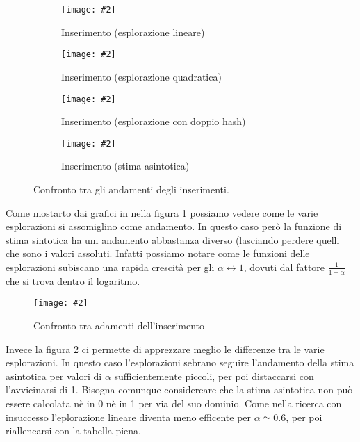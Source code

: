 \documentclass{article}
\newcommand{\image}[3][1]{
	\centering
	\texttt{[image: \#2]}
	\caption{#3}
}
\begin{document}
\begin{figure}[H]
\begin{subfigure}[b]{0.5\textwidth}
\image{Inserimento_Lineare_scala_logaritmica}{Inserimento (esplorazione lineare)}
\end{subfigure}
\begin{subfigure}[b]{0.5\textwidth}
\image{Inserimento_Quadratico_scala_logaritmica}{Inserimento (esplorazione quadratica)}
\end{subfigure}
\begin{subfigure}[b]{0.5\textwidth}
\image{Inserimento_Doppio_scala_logaritmica}{Inserimento (esplorazione con doppio hash)}
\end{subfigure}
\begin{subfigure}[b]{0.5\textwidth}
\image{Inserimento_Asintotica_scala_logaritmica}{Inserimento (stima asintotica)}
\end{subfigure}
\caption{Confronto tra gli andamenti degli inserimenti.}
\label{fig:Inserimento_quartetto}
\end{figure}

Come mostarto dai grafici in nella figura \ref{fig:Inserimento_quartetto} possiamo vedere come le varie esplorazioni si assomiglino come andamento. In questo caso però la funzione di stima sintotica ha um andamento abbastanza diverso (lasciando perdere quelli che sono i valori assoluti. Infatti possiamo notare come le funzioni delle esplorazioni subiscano una rapida crescità per gli $\alpha \longleftrightarrow 1$, dovuti dal fattore $\frac{1}{1 - \alpha}$ che si trova dentro il logaritmo. 

\begin{figure}[H]
\image[0.75]{Inserimento_Confronto_asintotico_scala_logaritmica}{Confronto tra adamenti dell'inserimento}
\label{fig:Inserimento_Confronto_asintotico_scala_logaritmica}
\end{figure}

Invece la figura \ref{fig:Inserimento_Confronto_asintotico_scala_logaritmica} ci permette di apprezzare meglio le differenze tra le varie esplorazioni. In questo caso l'esplorazioni sebrano seguire l'andamento della stima asintotica per valori di $\alpha$ sufficientemente piccoli, per poi distaccarsi con l'avvicinarsi di 1. Bisogna comunque considereare che la stima asintotica non può essere calcolata nè in 0 nè in 1 per via del suo dominio.
Come nella ricerca con insuccesso l'eplorazione lineare diventa meno efficente per $\alpha \simeq 0.6$, per poi riallenearsi con la tabella piena.
\end{document}
